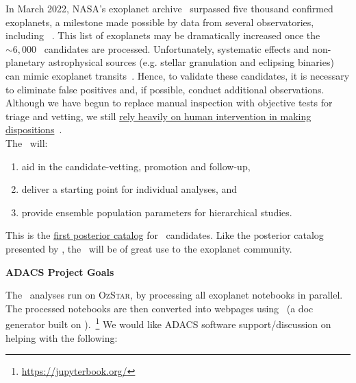 \documentclass[floatfix,onecolumn]{aastex631}
\newcommand{\ozstar}{\textsc{OzStar}}
\begin{document}
In March 2022, NASA's exoplanet archive~\citep{Akeson:2013:PASP} surpassed five thousand confirmed exoplanets, a milestone made possible by data from several observatories, including \tess~\citep{Ricker:2015:JATIS, Stassun:2018:AJ, Stassun:2019:AJ, Guerrero:2021:ApJS}.
This list of exoplanets may be dramatically increased once the $\sim6,000$ \tess\ candidates are processed.
Unfortunately, systematic effects and non-planetary astrophysical sources (e.g. stellar granulation and eclipsing binaries) can mimic exoplanet transits~\citep{Rowe:2014:ApJ}.
Hence, to validate these candidates, it is necessary to eliminate false positives and, if possible, conduct additional observations.
Although we have begun to replace manual inspection with objective tests for triage and vetting, we still \underline{rely heavily on human intervention in making dispositions}~\citep{Guerrero:2021:ApJS}.\\



The \tessAtlas\ will:
\begin{enumerate}
    \item aid in the candidate-vetting, promotion and follow-up, 
    \item deliver a starting point for individual analyses, and
    \item provide ensemble population parameters for hierarchical studies.
\end{enumerate}

This is the \underline{first posterior catalog} for \tess\ candidates. Like the  posterior catalog presented by \citet{Rowe:2014:ApJ}, the \tessAtlas\ will be of great use to the exoplanet community. 

\vspace{1em}


\large{\textbf{ADACS Project Goals}}\hfill\vspace{0.3em}

The \tessAtlas\ analyses run on \ozstar, by processing all exoplanet notebooks in parallel. 
The processed notebooks are then converted into webpages using \jupyterbook\ (a doc generator built on \sphinx).~\footnote{\url{https://jupyterbook.org/}}
We would like ADACS software support/discussion on helping with the following:
\end{document}
